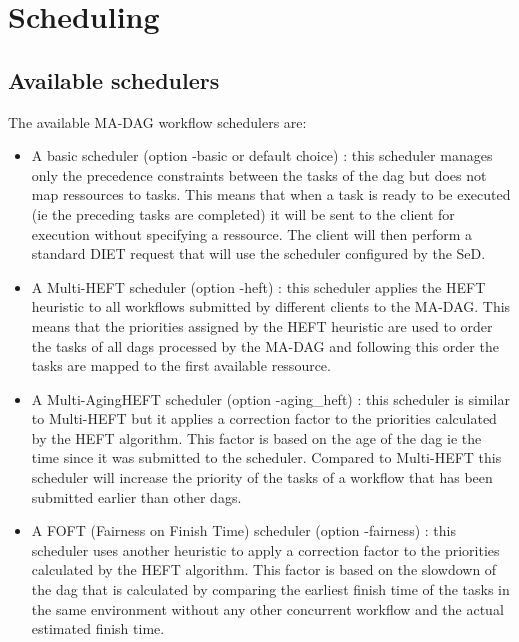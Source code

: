 \section{Scheduling}

\label{sec:wf_sched}

\subsection{Available schedulers}

The available MA-DAG workflow schedulers are:

\begin{itemize}

\item A basic scheduler (option -basic or default choice) :
this scheduler manages only
the precedence constraints between the tasks of the dag but does not
map ressources to tasks. This means that when a task is ready to be
executed (ie the preceding tasks are completed) it will be sent to
the client for execution without specifying a ressource. The client
will then perform a standard DIET request that will use the scheduler
configured by the SeD.

\item A Multi-HEFT scheduler (option -heft) : this scheduler applies
the HEFT heuristic to all workflows submitted by different clients to
the MA-DAG. This means that the priorities assigned by the HEFT
heuristic are used to order the tasks of all dags processed by the
MA-DAG and following this order the tasks are mapped to the first
available ressource.

\item A Multi-AgingHEFT scheduler (option -aging\_heft) : this scheduler
is similar to Multi-HEFT but it applies a correction factor to the
priorities calculated by the HEFT algorithm. This factor is based on
the age of the dag ie the time since it was submitted to the scheduler.
Compared to Multi-HEFT this scheduler will increase the priority of the
tasks of a workflow that has been submitted earlier than other dags.

\item A FOFT (Fairness on Finish Time) scheduler (option -fairness) :
this scheduler uses another heuristic to apply a correction factor to
the priorities calculated by the HEFT algorithm. This factor is based
on the slowdown of the dag that is calculated by comparing the earliest
finish time of the tasks in the same environment without any other
concurrent workflow and the actual estimated finish time.

\end{itemize}

